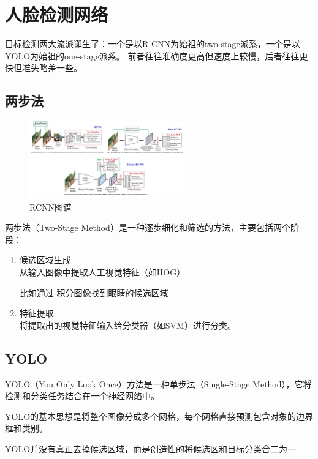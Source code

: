 \documentclass{lzureport}
\begin{document}
\newpage
\section{人脸检测网络}
目标检测两大流派诞生了：一个是以R-CNN为始祖的two-stage派系，一个是以YOLO为始祖的one-stage派系。
前者往往准确度更高但速度上较慢，后者往往更快但准头略差一些。

\subsection{两步法}

\begin{figure}[htpb]
	\centering
	\includegraphics[width=0.6\textwidth]{figure/RCNN图谱.png}
	\caption{RCNN图谱}
	\label{fig:RCNN图谱}
\end{figure}


两步法（Two-Stage Method）是一种逐步细化和筛选的方法，主要包括两个阶段：

\begin{enumerate}[itemindent=1em,label=\arabic*)]
	\item 候选区域生成\\
	从输入图像中提取人工视觉特征（如HOG）

	比如通过 \textcolor{YBXPurple}{积分图像}找到眼睛的候选区域
	\item 特征提取\\
	将提取出的视觉特征输入给分类器（如SVM）进行分类。
\end{enumerate}


\subsection{YOLO}
YOLO（You Only Look Once）方法是一种单步法（Single-Stage Method），它将检测和分类任务结合在一个神经网络中。

YOLO的基本思想是将整个图像分成多个网格，每个网格直接预测包含对象的边界框和类别。

YOLO并没有真正去掉候选区域，而是创造性的将候选区和目标分类合二为一
\end{document}
